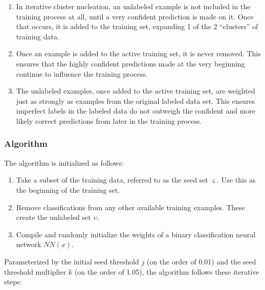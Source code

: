 \documentclass[10pt]{article}
\begin{document}
\begin{enumerate}
    \item In iterative cluster nucleation, an unlabeled example is not included in the training process at all, until a very confident prediction is made on it. Once that occurs, it is added to the training set, expanding 1 of the 2 ``clusters'' of training data.
    \item Once an example is added to the active training set, it is never removed. This ensures that the highly confident predictions made at the very beginning continue to influence the training process.
    \item The unlabeled examples, once added to the active training set, are weighted just as strongly as examples from the original labeled data set. This ensures imperfect labels in the labeled data do not outweigh the confident and more likely correct predictions from later in the training process.
\end{enumerate}

\subsubsection{Algorithm}

The algorithm is initialized as follows:

\begin{enumerate}
    \item Take a subset of the training data, referred to as the seed set $\varsigma$. Use this as the beginning of the training set.
    \item Remove classifications from any other available training examples. These create the unlabeled set $\upsilon$.
    \item Compile and randomly initialize the weights of a binary classification neural network $NN(x)$.
\end{enumerate}

Parameterized by the initial seed threshold $j$ (on the order of 0.01) and the seed threshold multiplier $k$ (on the order of 1.05), the algorithm follows these iterative steps:
\end{document}
